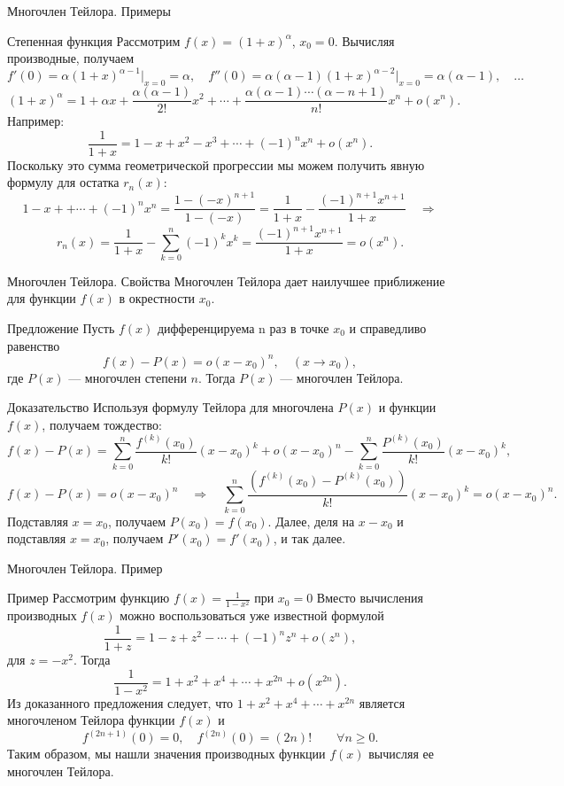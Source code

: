 \documentclass[8pt]{beamer}
\begin{document}
\begin{frame}{Многочлен Тейлора. Примеры}
\begin{block}{Степенная функция}
Рассмотрим $f(x)=(1+x)^\alpha$, $x_0 = 0$. Вычисляя производные, получаем
$$
f'(0) = \alpha(1+x)^{\alpha-1}\Big|_{x=0} = \alpha,\quad
f''(0) =\alpha(\alpha-1)(1+x)^{\alpha-2}\Big|_{x=0} = \alpha(\alpha-1),\quad \ldots
$$
$$(1+x)^\alpha= 1+\alpha x+\frac{\alpha(\alpha-1)}{2!}x^2+\cdots+\frac{\alpha(\alpha-1)\cdots (\alpha-n+1)}{n!} x^n+o(x^{n}).$$
Например:
$$\frac{1}{1+x}= 1- x+x^2-x^3+\cdots+(-1)^{n} x^n+o(x^{n}).$$
Поскольку это сумма геометрической прогрессии мы можем получить явную формулу для остатка $r_n(x)$:
$$ 1- x++\cdots+(-1)^{n} x^n = \frac{1-(-x)^{n+1}}{1-(-x)} = \frac{1}{1+x} - \frac{(-1)^{n+1}x^{n+1}}{1+x}\quad \Rightarrow$$
$$r_n(x) = \frac{1}{1+x} - \sum_{k=0}^n (-1)^k x^k= \frac{(-1)^{n+1}x^{n+1}}{1+x} = o(x^n).$$
\end{block}
\end{frame}

\begin{frame}{Многочлен Тейлора. Свойства}
Многочлен Тейлора дает наилучшее приближение для функции $f(x)$ в окрестности $x_0$.
\begin{block}{Предложение}
Пусть $f(x)$ дифференцируема n раз в точке $x_0$ и справедливо равенство
$$f(x) - P(x) = o(x-x_0)^n,\quad (x\to x_0),$$
где $P(x)$ --- многочлен степени $n$. Тогда $P(x)$ --- многочлен Тейлора.
\end{block}
\begin{block}{Доказательство}
Используя формулу Тейлора для многочлена $P(x)$ и функции $f(x)$, получаем тождество:
$$ f(x) - P(x) = \sum_{k=0}^n \frac{f^{(k)}(x_0)}{k!}(x-x_0)^k + o(x-x_0)^n-\sum_{k=0}^n \frac{P^{(k)}(x_0)}{k!}(x-x_0)^k,$$
$$f(x) - P(x) = o(x-x_0)^n\quad\Rightarrow\quad 
 \sum_{k=0}^n \frac{(f^{(k)}(x_0)-P^{(k)}(x_0))}{k!}(x-x_0)^k  = o(x-x_0)^n.$$
Подставляя $x=x_0$, получаем $P(x_0) = f(x_0)$. Далее, деля на $x-x_0$ и подставляя $x=x_0$, получаем $P'(x_0) = f'(x_0)$, и так далее.
\end{block}

\end{frame}

\begin{frame}{Многочлен Тейлора. Пример}
\begin{block}{Пример}
Рассмотрим функцию $\displaystyle f(x) = \frac{1}{1-x^2}$ при $x_0 = 0$
Вместо вычисления производных $f(x)$ можно воспользоваться уже известной формулой
$$\frac{1}{1+z} = 1-z+z^2-\cdots+(-1)^n z^n+o(z^n),$$
для $z=-x^2$. Тогда
$$\frac{1}{1-x^2} =1+x^2+x^4+\cdots+ x^{2n}+o(x^{2n}).$$
Из доказанного предложения следует, что $1+x^2+x^4+\cdots+ x^{2n}$ является многочленом Тейлора функции $f(x)$ и
$$f^{(2n+1)}(0)=0,\quad f^{(2n)}(0)=(2n)! \qquad \forall n\ge0.$$
Таким образом, мы нашли значения производных функции $f(x)$ вычисляя ее многочлен Тейлора.
\end{block}
\end{frame}
\end{document}
